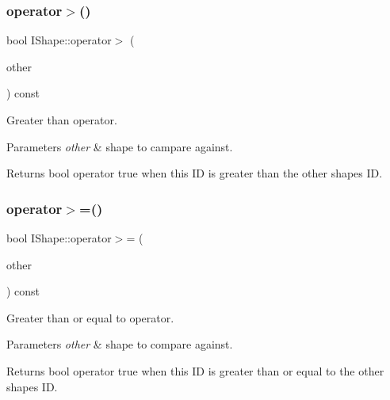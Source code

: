 \subsubsection{\texorpdfstring{operator$>$()}{operator>()}}
{\footnotesize\ttfamily bool I\+Shape\+::operator$>$ (\begin{DoxyParamCaption}\item[{const \mbox{\hyperlink{class_i_shape}{I\+Shape}} \&}]{other }\end{DoxyParamCaption}) const}



Greater than operator. 


\begin{DoxyParams}{Parameters}
{\em other} & shape to campare against. \\
\hline
\end{DoxyParams}
\begin{DoxyReturn}{Returns}
bool operator true when this ID is greater than the other shape\textquotesingle{}s ID. 
\end{DoxyReturn}
\mbox{\label{class_i_shape_ac05b13d61818afc793cb0387703a0998}} 
\subsubsection{\texorpdfstring{operator$>$=()}{operator>=()}}
{\footnotesize\ttfamily bool I\+Shape\+::operator$>$= (\begin{DoxyParamCaption}\item[{const \mbox{\hyperlink{class_i_shape}{I\+Shape}} \&}]{other }\end{DoxyParamCaption}) const}



Greater than or equal to operator. 


\begin{DoxyParams}{Parameters}
{\em other} & shape to compare against. \\
\hline
\end{DoxyParams}
\begin{DoxyReturn}{Returns}
bool operator true when this ID is greater than or equal to the other shape\textquotesingle{}s ID. 
\end{DoxyReturn}
\mbox{\label{class_i_shape_a485f6770c4e56b31c76d368b959b6f00}} 
